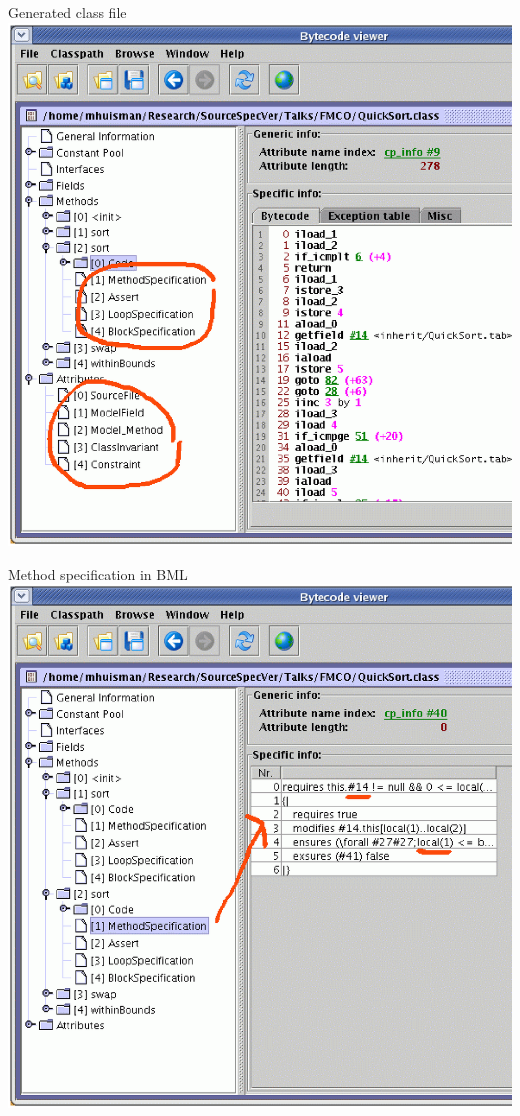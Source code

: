 \documentclass[final,nocolorBG,a4,mobius,nototal,pdf,slideColor]{prosper}
\begin{document}
\begin{slide}{Generated class file}
\vspace*{-1.5em}
\includegraphics[height=\textheight]{screen10.ps}
\end{slide}

\begin{slide}{Method specification in BML}
\vspace*{-1.5em}
\includegraphics[height=\textheight]{screen11.ps}
\end{slide}
\end{document}

